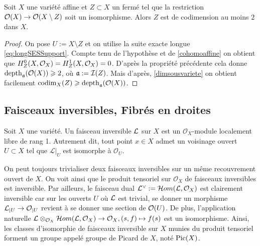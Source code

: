 \begin{cor}\label{cohomcodimgeq2}
Soit $X$ une variété affine et $Z\subset X$ un fermé tel que la restriction $\mathcal{O}(X)\rightarrow \mathcal{O}(X\setminus Z)$ soit un isomorphisme. Alors $Z$ est de codimension au moins $2$ dans $X$.
\end{cor}
\begin{proof}
On pose $U:=X\setminus Z$ et on utilise la suite exacte longue \ref{eq:longSESSupport}. Compte tenu de l'hypothèse et de \ref{cohomoaffine} on obtient que $H^0_Z(X,\mathcal{O}_X)=H^1_Z(X,\mathcal{O}_X)=0$. D'après la propriété précédente cela donne $\operatorname{depth}_\mathfrak{a}(\mathcal{O}(X))\geqslant 2$, où $\mathfrak{a}:=\mathcal{I}(Z)$. Mais d'après, \ref{dimsousvariete} on obtient facilement $\operatorname{codim}_X(Z)\geqslant \operatorname{depth}_\mathfrak{a}(\mathcal{O}(X))$.
\end{proof}


\subsection{Faisceaux inversibles, Fibrés en droites}
\begin{defn}
Soit $X$ une variété. Un faisceau inversible $\mathcal{L}$ sur $X$ est un $\mathcal{O}_X$-module localement libre de rang 1. Autrement dit, tout point $x\in X$ admet un voisinage ouvert $U \subset X$ tel que ${\mathcal L}|_U$ est isomorphe à ${\mathcal O}_U$.
\end{defn}

On peut toujours trivialiser deux faisceaux inversibles sur un même recouvrement ouvert de $X$. On voit ainsi que le produit tensoriel sur $\mathcal{O}_X$ de faisceaux inversibles est inversible. Par ailleurs, le faisceau dual $\mathcal{L}^\vee:=\mathcal{H} om(\mathcal{L},\mathcal{O}_X)$ est clairement inversible car sur les ouverts $U$ où $\mathcal{L}$ est trivial, se donner un morphisme $\mathcal{L}_{|U}\rightarrow\mathcal{O}_{|U}$ revient à se donner une section de $\mathcal{O}(U)$. De plus, l'application naturelle $\mathcal{L}\otimes_{\mathcal{O}_X} \mathcal{H} om(\mathcal{L},\mathcal{O}_X)\rightarrow \mathcal{O}_X, (s,f)\mapsto f(s)$ est un isomorphisme. Ainsi, les classes d'isomorphie de faisceaux inversible sur $X$ munies du produit tensoriel forment un groupe appelé groupe de Picard de $X$, noté $\operatorname{Pic}(X)$. 

